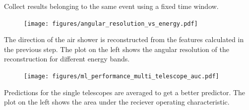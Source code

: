 \begin{multicols}{2}
\begin{center}
\begin{streamblock}[equal height group=C, width=0.8\linewidth]{-5mm}{-5mm}{}
\begin{multicols}{2}
          \end{multicols}
        \end{streamblock}%


        \begin{streamblock}[height=2cm, width=0.8\linewidth]{-5mm}{-5mm}{}%
          \begin{center}
            Collect results belonging to the same event using a fixed time window.
          \end{center}
        \end{streamblock}%

        \begin{streamblock}[equal height group=C, width=0.8\linewidth]{-5mm}{-5mm}{}%
          \begin{multicols}{2}
            \begin{figure}
              \texttt{[image: figures/angular\_resolution\_vs\_energy.pdf]}
            \end{figure}
            \columnbreak
            The direction of the air shower is reconstructed from the features calculated in the previous step.
            The plot on the left shows the angular resolution of the reconstruction for different energy bands.
          \end{multicols}
        \end{streamblock}%

        \begin{streamblock}[equal height group=C, width=0.8\linewidth]{-5mm}{-5mm}{}%
          \begin{multicols}{2}
            \begin{figure}
              \texttt{[image: figures/ml\_performance\_multi\_telescope\_auc.pdf]}
            \end{figure}
            \columnbreak
            Predictions for the single telescopes are averaged to get a better predictor.
            The plot on the left shows the area under the reciever operating characteristic.
          \end{multicols}
        \end{streamblock}%

      \end{center}

\end{multicols}


